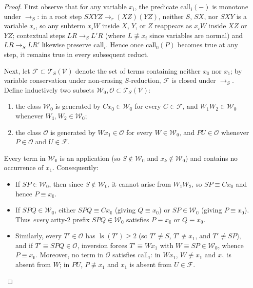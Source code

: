 \documentclass[11pt,reqno]{amsart}
\numberwithin{equation}{section}
\theoremstyle{plain}
\theoremstyle{definition}
\theoremstyle{remark}
\DeclareMathOperator{\ls}{ls}
\newcommand{\TSV}{\mathcal{T}_S(\mathcal{V})}
\newcommand{\redS}{\to_S}
\begin{document}
\begin{proof}
First observe that for any variable $x_i$, the predicate $\mathrm{call}_i(-)$ is monotone under $\redS$: in a root step $S X Y Z \to_r (X Z)(Y Z)$, neither $S$, $S X$, nor $S X Y$ is a variable $x_i$, so any subterm $x_i W$ inside $X$, $Y$, or $Z$ reappears as $x_i W$ inside $X Z$ or $Y Z$; contextual steps $L R \redS L' R$ (where $L \not\equiv x_i$ since variables are normal) and $L R \redS L R'$ likewise preserve $\mathrm{call}_i$. Hence once $\mathrm{call}_0(P)$ becomes true at any step, it remains true in every subsequent reduct.

Next, let $\mathcal{F} \subset \TSV$ denote the set of terms containing neither $x_0$ nor $x_1$; by variable conservation under non-erasing $S$-reduction, $\mathcal{F}$ is closed under $\redS$. Define inductively two subsets $\mathcal{W}_0, \mathcal{O} \subset \TSV$:
\begin{enumerate}[label=(\roman*),leftmargin=2.2em]
  \item the class $\mathcal{W}_0$ is generated by $C x_0 \in \mathcal{W}_0$ for every $C \in \mathcal{F}$, and $W_1 W_2 \in \mathcal{W}_0$ whenever $W_1, W_2 \in \mathcal{W}_0$;
  \item the class $\mathcal{O}$ is generated by $W x_1 \in \mathcal{O}$ for every $W \in \mathcal{W}_0$, and $P U \in \mathcal{O}$ whenever $P \in \mathcal{O}$ and $U \in \mathcal{F}$.
\end{enumerate}
Every term in $\mathcal{W}_0$ is an application (so $S \notin \mathcal{W}_0$ and $x_k \notin \mathcal{W}_0$) and contains no occurrence of $x_1$. Consequently:
\begin{itemize}[leftmargin=2.0em]
  \item If $S P \in \mathcal{W}_0$, then since $S \notin \mathcal{W}_0$, it cannot arise from $W_1 W_2$, so $S P \equiv C x_0$ and hence $P \equiv x_0$.
  \item If $S P Q \in \mathcal{W}_0$, either $S P Q \equiv C x_0$ (giving $Q \equiv x_0$) or $S P \in \mathcal{W}_0$ (giving $P \equiv x_0$). Thus \emph{every} arity-$2$ prefix $S P Q \in \mathcal{W}_0$ satisfies $P \equiv x_0$ or $Q \equiv x_0$.
  \item Similarly, every $T' \in \mathcal{O}$ has $\ls(T') \ge 2$ (so $T' \not\equiv S$, $T' \not\equiv x_1$, and $T' \not\equiv S P$), and if $T' \equiv S P Q \in \mathcal{O}$, inversion forces $T' \equiv W x_1$ with $W \equiv S P \in \mathcal{W}_0$, whence $P \equiv x_0$. Moreover, no term in $\mathcal{O}$ satisfies $\mathrm{call}_1$: in $W x_1$, $W \not\equiv x_1$ and $x_1$ is absent from $W$; in $P U$, $P \not\equiv x_1$ and $x_1$ is absent from $U \in \mathcal{F}$.

\end{itemize}
\end{proof}
\end{document}
